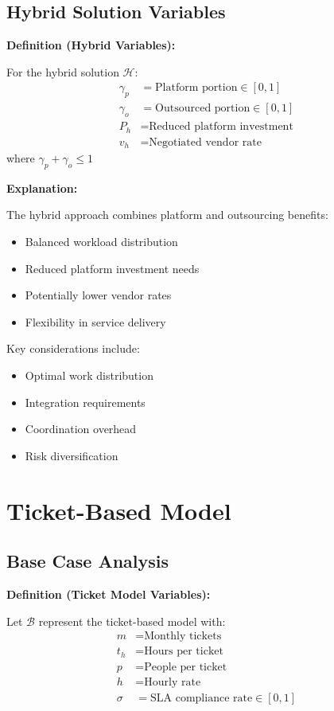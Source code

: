 \documentclass[12pt,a4paper]{article}
\newenvironment{definition}[1]
{\begin{mdframed}[style=definitionstyle]
\textbf{Definition (#1):}\par}
{\end{mdframed}}
\newenvironment{explanation}
{\begin{mdframed}[style=explanationstyle]
\textbf{Explanation:}\par}
{\end{mdframed}}
\begin{document}
\subsection{Hybrid Solution Variables}
\begin{definition}{Hybrid Variables}
For the hybrid solution $\mathcal{H}$:
\begin{align*}
    \gamma_p &= \text{Platform portion} \in [0,1] \\
    \gamma_o &= \text{Outsourced portion} \in [0,1] \\
    P_h &= \text{Reduced platform investment} \\
    v_h &= \text{Negotiated vendor rate}
\end{align*}
where $\gamma_p + \gamma_o \leq 1$
\end{definition}

\begin{explanation}
The hybrid approach combines platform and outsourcing benefits:
\begin{itemize}
    \item Balanced workload distribution
    \item Reduced platform investment needs
    \item Potentially lower vendor rates
    \item Flexibility in service delivery
\end{itemize}

Key considerations include:
\begin{itemize}
    \item Optimal work distribution
    \item Integration requirements
    \item Coordination overhead
    \item Risk diversification
\end{itemize}
\end{explanation}

\section{Ticket-Based Model}
\subsection{Base Case Analysis}
\begin{definition}{Ticket Model Variables}
Let $\mathcal{B}$ represent the ticket-based model with:
\begin{align*}
    m &= \text{Monthly tickets} \\
    t_h &= \text{Hours per ticket} \\
    p &= \text{People per ticket} \\
    h &= \text{Hourly rate} \\
    \sigma &= \text{SLA compliance rate} \in [0,1]
\end{align*}
\end{definition}
\end{document}
